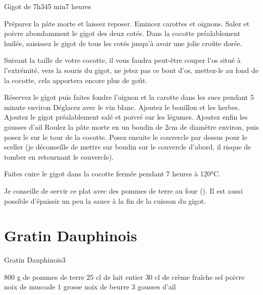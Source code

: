 {\begin{recette}{Gigot de 7h}{3}{45 min}{7 heures}
\begin{preparation}
\etape Préparez la pâte morte et laissez reposer.
\etape Emincez carottes et oignons.
\etape Salez et poivre abondamment le gigot des deux cotés.
\etape Dans la cocotte préalablement huilée, saisissez le gigot de tous les cotés jusqu'à avoir une jolie croûte dorée.
\begin{remarque}
Suivant la taille de votre cocotte, il vous faudra peut-être couper l'os situé à l'extrémité, vers la souris du gigot, ne jetez 
pas ce bout d'os, mettez-le au fond de la cocotte, cela apportera encore plus de goût.
\end{remarque}
\etape Réservez le gigot puis faites fondre l'oignon et la carotte dans les sucs pendant 5 minute environ
\etape Déglacez avec le vin blanc. Ajoutez le bouillon et les herbes. 
\etape Ajoutez le gigot préalablement salé et poivré sur les légumes. Ajoutez enfin les gousses d'ail
\etape Roulez la pâte morte en un boudin de 2cm de diamètre environ, puis posez le sur le tour de la cocotte. Posez ensuite le couvercle par dessus pour le sceller (je déconseille de mettre sur boudin sur le couvercle d'abord, il risque de tomber en retournant le couvercle).
\end{preparation}

\begin{cuisson}
Faites cuire le gigot dans la cocotte fermée pendant 7 heures à 120°C. 

Je conseille de servir ce plat avec des pommes de terre au four (). Il est aussi possible 
d'épaissir un peu la sauce à la fin de la cuisson du gigot. 
\end{cuisson}
\end{recette}

\section{Gratin Dauphinois}
\begin{recette}{Gratin Dauphinois}{3}{}{}
\begin{ingredients}
\ingredient $800$ g de pommes de terre
\ingredient $25$ cl de lait entier
\ingredient $30$ cl de crème fraîche
\ingredient sel
\ingredient poivre
\ingredient noix de muscade
\ingredient $1$ grosse noix de beurre
\ingredient $3$ gousses d'ail
\end{ingredients}


\end{recette}}
